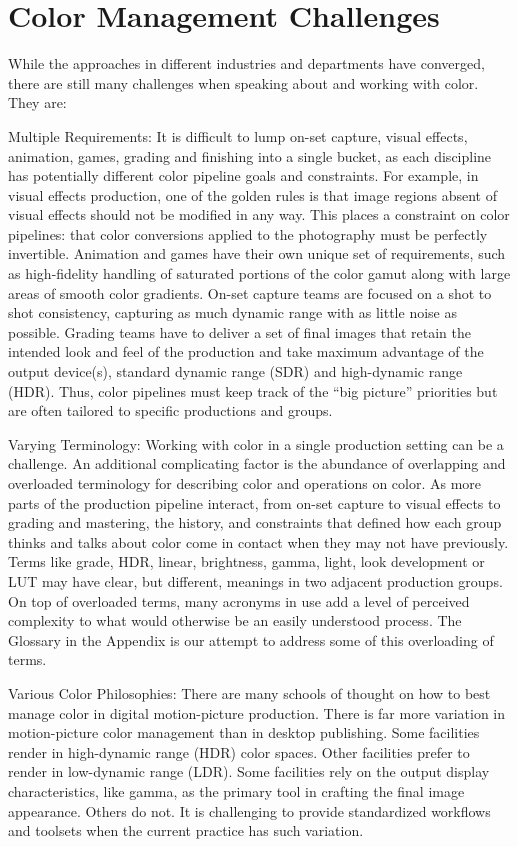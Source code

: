 \section{Color Management Challenges}%
\label{sec:color-management-challenges}

While the approaches in different industries and departments have converged, there are still many challenges when speaking about and working with color. They are:

Multiple Requirements: It is difficult to lump on-set capture, visual effects, animation, games, grading and finishing into a single bucket, as each discipline has potentially different color pipeline goals and constraints. For example, in visual effects production, one of the golden rules is that image regions absent of visual effects should not be modified in any way. This places a constraint on color pipelines: that color conversions applied to the photography must be perfectly invertible. Animation and games have their own unique set of requirements, such as high-fidelity handling of saturated portions of the color gamut along with large areas of smooth color gradients. On-set capture teams are focused on a shot to shot consistency, capturing as much dynamic range with as little noise as possible. Grading teams have to deliver a set of final images that retain the intended look and feel of the production and take maximum advantage of the output device(s), standard dynamic range (SDR) and high-dynamic range (HDR). Thus, color pipelines must keep track of the “big picture” priorities but are often tailored to specific productions and groups.

Varying Terminology: Working with color in a single production setting can be a challenge. An additional complicating factor is the abundance of overlapping and overloaded terminology for describing color and operations on color. As more parts of the production pipeline interact, from on-set capture to visual effects to grading and mastering, the history, and constraints that defined how each group thinks and talks about color come in contact when they may not have previously. Terms like grade, HDR, linear, brightness, gamma, light, look development or LUT may have clear, but different, meanings in two adjacent production groups. On top of overloaded terms, many acronyms in use add a level of perceived complexity to what would otherwise be an easily understood process. The Glossary in the Appendix is our attempt to address some of this overloading of terms.

Various Color Philosophies: There are many schools of thought on how to best manage color in digital motion-picture production. There is far more variation in motion-picture color management than in desktop publishing. Some facilities render in high-dynamic range (HDR) color spaces. Other facilities prefer to render in low-dynamic range (LDR). Some facilities rely on the output display characteristics, like gamma, as the primary tool in crafting the final image appearance. Others do not. It is challenging to provide standardized workflows and toolsets when the current practice has such variation.

